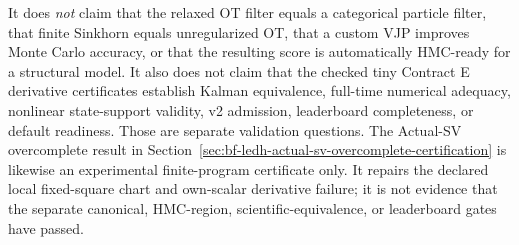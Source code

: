 It does \emph{not} claim that the relaxed OT filter equals a categorical
particle filter, that finite Sinkhorn equals unregularized OT, that a custom VJP
improves Monte Carlo accuracy, or that the resulting score is automatically
HMC-ready for a structural model.  It also does not claim that the checked tiny
Contract E derivative certificates establish Kalman equivalence, full-time
numerical adequacy, nonlinear state-support validity, v2 admission, leaderboard
completeness, or default readiness.  Those are separate validation questions.
The Actual-SV overcomplete result in
Section~\ref{sec:bf-ledh-actual-sv-overcomplete-certification} is likewise an
experimental finite-program certificate only.  It repairs the declared local
fixed-square chart and own-scalar derivative failure; it is not evidence that
the separate canonical, HMC-region, scientific-equivalence, or leaderboard
gates have passed.

\FloatBarrier
